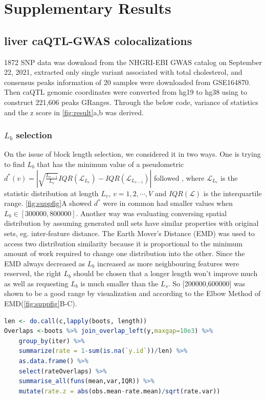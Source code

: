 \documentclass{article}
\begin{document}

\section{Supplementary Results} \label{sec:results}
\subsection{liver caQTL-GWAS colocalizations}
1872 SNP data was download from the NHGRI-EBI GWAS catalog \citep{gwascatalog} on September 22, 2021, extracted only single variant  associated with total cholesterol, and consensus peaks information of 20 samples were downloaded from GSE164870.
Then caQTL genomic coordinates were converted from hg19 to hg38 using  to construct 221,606 peaks GRanges. Through the below code, variance of statistics and the z score in \cref{fig:result}a,b was derived.

\subsubsection{$L_b$ selection}
On the issue of 
block length selection, we considered it in two ways. One is trying to find $L_b$ that has the minimum value of a pseudometric $d^*(v)=|\sqrt{\frac{L_{v-1}}{L_v}}IQR(\mathcal{L}_{L_v})-IQR(\mathcal{L}_{L_{v-1}})|$ followed \citet{bickel2010subsampling}, where $\mathcal{L}_{L_v}$ is the statistic distribution at length $L_v$, $v=1,2,\cdots,V$ and $IQR(\mathcal{L})$ is the interquartile range. \cref{fig:suppfig}A showed $d^*$ were in common had smaller values when $L_b\in[300000,800000]$. Another way was evaluating conversing spatial distribution by assuming generated null sets have similar properties with original sets, eg. inter-feature distance. The Earth Mover's Distance (EMD) was used to access two distribution similarity because it is proportional to the minimum amount of work required to change one distribution into the other. Since the EMD always decreased as $L_b$ increased as more neighbouring features were reserved, the right $L_b$ should be chosen that a longer length won’t improve much as well as requesting $L_b$ is much smaller than the $L_s$. So [200000,600000] was shown to be  a good range by visualization and according to the Elbow Method of EMD(\cref{fig:suppfig}B-C). 

\begin{lstlisting}[language=R]
len <- do.call(c,lapply(boots, length))
Overlaps <-boots %>% join_overlap_left(y,maxgap=10e3) %>%
    group_by(iter) %>%
    summarize(rate = 1-sum(is.na(`y.id`))/len) %>%
    as.data.frame() %>% 
    select(rateOverlaps) %>% 
    summarise_all(funs(mean,var,IQR)) %>% 
    mutate(rate.z = abs(obs.mean-rate.mean)/sqrt(rate.var))

\end{lstlisting} 
\end{document}
